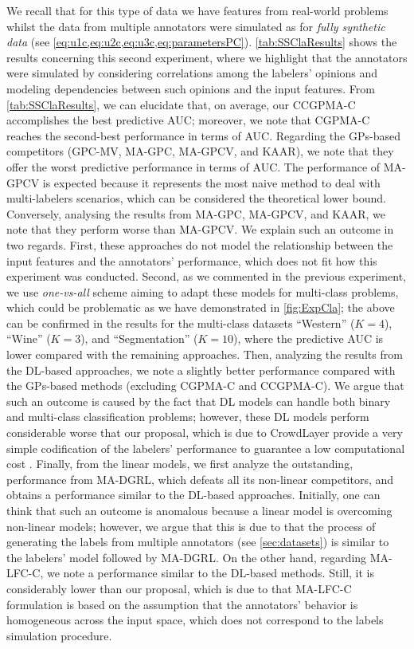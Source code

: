 \documentclass[journal]{IEEEtran}
\begin{document}
We recall that for this type of data we have features from real-world problems whilst the data from multiple annotators were simulated as for \textit{fully synthetic data} (see \cref{eq:u1c,eq:u2c,eq:u3c,eq:parametersPC}). \cref{tab:SSClaResults} shows the results concerning this second experiment, where we highlight that the annotators were simulated by considering correlations among the labelers' opinions and modeling dependencies between such opinions and the input features. From \cref{tab:SSClaResults}, we can elucidate that, on average, our CCGPMA-C accomplishes the best predictive AUC; moreover, we note that CGPMA-C reaches the second-best performance in terms of AUC. Regarding the GPs-based competitors (GPC-MV, MA-GPC, MA-GPCV, and KAAR), we note that they offer the worst predictive performance in terms of AUC. The performance of MA-GPCV is expected because it represents the most naive method to deal with multi-labelers scenarios, which can be considered the theoretical lower bound. Conversely, analysing the results from MA-GPC, MA-GPCV, and KAAR, we note that they perform worse than MA-GPCV. We explain such an outcome in two regards. First, these approaches do not model the relationship between the input features and the annotators' performance, which does not fit how this experiment was conducted. Second, as we commented in the previous experiment, we use \textit{one-vs-all} scheme aiming to adapt these models for multi-class problems, which could be problematic as we have demonstrated in \cref{fig:ExpCla}; the above can be confirmed in the results for the multi-class datasets ``Western'' ($K=4$), ``Wine'' ($K=3$), and ``Segmentation'' ($K=10$), where the predictive AUC is lower compared with the remaining approaches. Then, analyzing the results from the DL-based approaches, we note a slightly better performance compared with the GPs-based methods (excluding CGPMA-C and CCGPMA-C). We argue that such an outcome is caused by the fact that DL models can handle both binary and multi-class classification problems; however, these DL models perform considerable worse that our proposal, which is due to CrowdLayer provide a very simple codification of the labelers' performance to guarantee a low computational cost \cite{morales2019scalable1}. Finally, from the linear models, we first analyze the outstanding, performance from MA-DGRL, which defeats all its non-linear competitors, and obtains a performance similar to the DL-based approaches. Initially, one can think that such an outcome is anomalous because a linear model is overcoming non-linear models; however, we argue that this is due to that the process of generating the labels from multiple annotators (see \cref{sec:datasets}) is similar to the labelers' model followed by MA-DGRL. On the other hand, regarding MA-LFC-C, we note a performance similar to the DL-based methods. Still, it is considerably lower than our proposal, which is due to that MA-LFC-C formulation is based on the assumption that the annotators' behavior is homogeneous across the input space, which does not correspond to the labels simulation procedure.   
\end{document}
